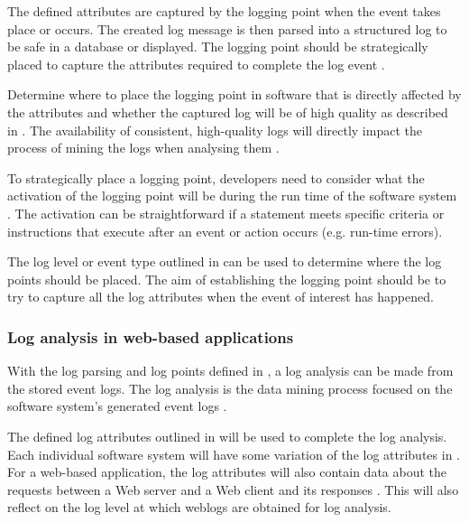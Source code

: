 The defined attributes are captured by the logging point when the event takes place or occurs. The created log message is then parsed into a structured log to be safe in a database or displayed. The logging point should be strategically placed to capture the attributes required to complete the log event \cite{Fedaghi2010}.\par Determine where to place the logging point in software that is directly affected by the attributes and whether the captured log will be of high quality as described in . The availability of consistent, high-quality logs will directly impact the process of mining the logs when analysing them \cite{Kherbouche2017}. \par To strategically place a logging point, developers need to consider what the activation of the logging point will be during the run time of the software system \cite{Pecchia2015, Cinque2013}. The activation can be straightforward if a statement meets specific criteria or instructions that execute after an event or action occurs (e.g. run-time errors). \par The log level or event type outlined in  can be used to determine where the log points should be placed. The aim of establishing the logging point should be to try to capture all the log attributes when the event of interest has happened.

\subsubsection{Log analysis in web-based applications}
With the log parsing and log points defined in , a log analysis can be made from the stored event logs. The log analysis is the data mining process focused on the software system's generated event logs \cite{Slaninova2014,Hasiloglu2018}. \par The defined log attributes outlined in  will be used to complete the log analysis. Each individual software system will have some variation of the log attributes in . For a web-based application, the log attributes will also contain data about the requests between a Web server and a Web client and its responses \cite{Slaninova2014, Dhanalakshmi2016}. This will also reflect on the log level at which weblogs are obtained for log analysis.


